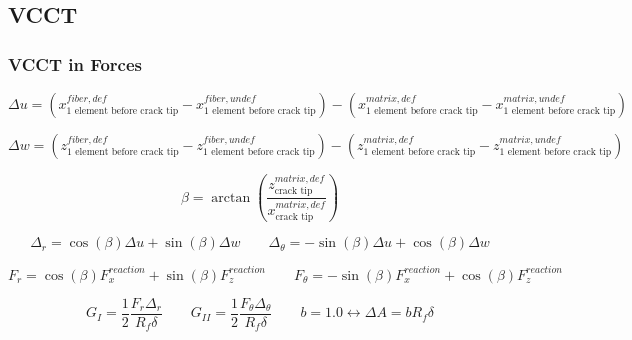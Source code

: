 \documentclass[first,firstsupp,lastsupp,handout,last,hyperref,table]{ETHclass}
\begin{document}
\subsection{VCCT}
\begin{frame}
\frametitle{VCCT  in Forces}
\vspace{-0.5cm}
\tiny
\centering
\captionsetup[figure]{font=scriptsize,labelfont=scriptsize}
\begin{equation}
\Delta u = \left(x^{fiber, def}_{\text{1 element before crack tip}}-x^{fiber, undef}_{\text{1 element before crack tip}}\right)-\left(x^{matrix, def}_{\text{1 element before crack tip}}-x^{matrix, undef}_{\text{1 element before crack tip}}\right)
\end{equation}

\begin{equation}
\Delta w = \left(z^{fiber, def}_{\text{1 element before crack tip}}-z^{fiber, undef}_{\text{1 element before crack tip}}\right)-\left(z^{matrix, def}_{\text{1 element before crack tip}}-z^{matrix, undef}_{\text{1 element before crack tip}}\right)
\end{equation}

\begin{equation}
\beta=\arctan{\left(\frac{z^{matrix, def}_{\text{crack tip}}}{x^{matrix, def}_{\text{crack tip}}}\right)}
\end{equation}

\begin{equation}
\Delta_{r}=\cos{\left(\beta\right)}\Delta u+\sin{\left(\beta\right)}\Delta w\qquad\Delta_{\theta}=-\sin{\left(\beta\right)}\Delta u+\cos{\left(\beta\right)}\Delta w
\end{equation}

\begin{equation}
F_{r}=\cos{\left(\beta\right)}F^{reaction}_{x}+\sin{\left(\beta\right)}F^{reaction}_{z}\qquad F_{\theta}=-\sin{\left(\beta\right)}F^{reaction}_{x}+\cos{\left(\beta\right)}F^{reaction}_{z}
\end{equation}

\begin{equation}
G_{I}=\frac{1}{2}\frac{F_{r}\Delta_{r}}{R_{f}\delta}\qquad G_{II}=\frac{1}{2}\frac{F_{\theta}\Delta_{\theta}}{R_{f}\delta}\qquad b=1.0\leftrightarrow\Delta A = bR_{f}\delta
\end{equation}
\end{frame}
\end{document}
